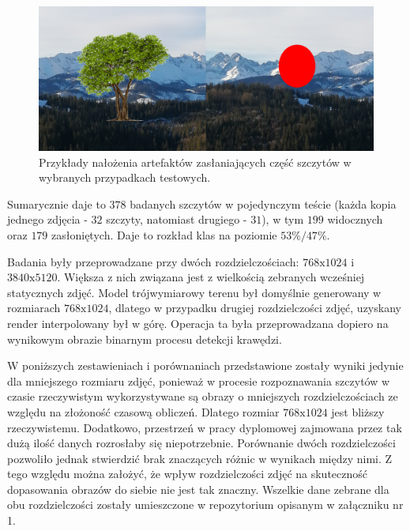 \begin{figure}[!h]
    \centering \includegraphics[width=.9\linewidth]{img/zaslanianie_przyklad.png}
    \caption{Przykłady nałożenia artefaktów zasłaniających część szczytów w wybranych przypadkach testowych.}
    \label{fig:not_visible_peaks}
\end{figure}

Sumarycznie daje to $378$ badanych szczytów w pojedynczym teście (każda kopia jednego zdjęcia - $32$ szczyty, natomiast drugiego - $31$), w tym $199$ widocznych oraz $179$ zasłoniętych. Daje to rozkład klas na poziomie $53\%/47\%$.

Badania były przeprowadzane przy dwóch rozdzielczościach: $768\textrm{x}1024$ i $3840\textrm{x}5120$. Większa z nich związana jest z wielkością zebranych wcześniej statycznych zdjęć. Model trójwymiarowy terenu był domyślnie generowany w rozmiarach $768\textrm{x}1024$, dlatego w przypadku drugiej rozdzielczości zdjęć, uzyskany render interpolowany był w górę. Operacja ta była przeprowadzana dopiero na wynikowym obrazie binarnym procesu detekcji krawędzi.

W poniższych zestawieniach i porównaniach przedstawione zostały wyniki jedynie dla mniejszego rozmiaru zdjęć, ponieważ w procesie rozpoznawania szczytów w czasie rzeczywistym wykorzystywane są obrazy o mniejszych rozdzielczościach ze względu na złożoność czasową obliczeń. Dlatego rozmiar $768\textrm{x}1024$ jest bliższy rzeczywistemu. Dodatkowo, przestrzeń w pracy dyplomowej zajmowana przez tak dużą ilość danych rozrosłaby się niepotrzebnie. Porównanie dwóch rozdzielczości pozwoliło jednak stwierdzić brak znaczących różnic w wynikach między nimi. Z tego względu można założyć, że wpływ rozdzielczości zdjęć na skuteczność dopasowania obrazów do siebie nie jest tak znaczny. Wszelkie dane zebrane dla obu rozdzielczości zostały umieszczone w repozytorium opisanym w załączniku nr 1. 


